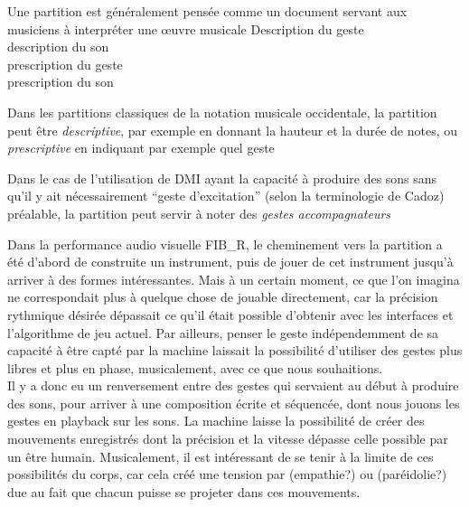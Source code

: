Une partition est généralement pensée comme un document servant aux musiciens à interpréter une œuvre musicale
Description du geste\\
description du son\\
prescription du geste\\
prescription du son

Dans les partitions classiques de la notation musicale occidentale, la partition peut être \textit{descriptive}, par exemple en donnant la hauteur et la durée de notes, ou \textit{prescriptive} en indiquant par exemple quel geste 

Dans le cas de l'utilisation de \gls{DMI} ayant la capacité à produire des sons sans qu'il y ait nécessairement ``geste d'excitation'' (selon la terminologie de Cadoz) préalable, la partition peut servir à noter des \textit{gestes accompagnateurs} 

Dans la performance audio visuelle FIB\_R, le cheminement vers la partition a été d'abord de construite un instrument, puis de jouer de cet instrument jusqu'à arriver à des formes intéressantes. Mais à un certain moment, ce que l'on imagina ne correspondait plus à quelque chose de jouable directement, car la précision rythmique désirée dépassait ce qu'il était possible d'obtenir avec les interfaces et l'algorithme de jeu actuel.
Par ailleurs, penser le geste indépendemment de sa capacité à être capté par la machine laissait la possibilité d'utiliser des gestes plus libres et plus en phase, musicalement, avec ce que nous souhaitions.\\
Il y a donc eu un renversement entre des gestes qui servaient au début à produire des sons, pour arriver à une composition écrite et séquencée, dont nous jouons les gestes en playback sur les sons.
La machine laisse la possibilité de créer des mouvements enregistrés dont la précision et la vitesse dépasse celle possible par un être humain. Musicalement, il est intéressant de se tenir à la limite de ces possibilités du corps, car cela créé une tension par (empathie?) ou (paréidolie?) due au fait que chacun puisse se projeter dans ces mouvements.


